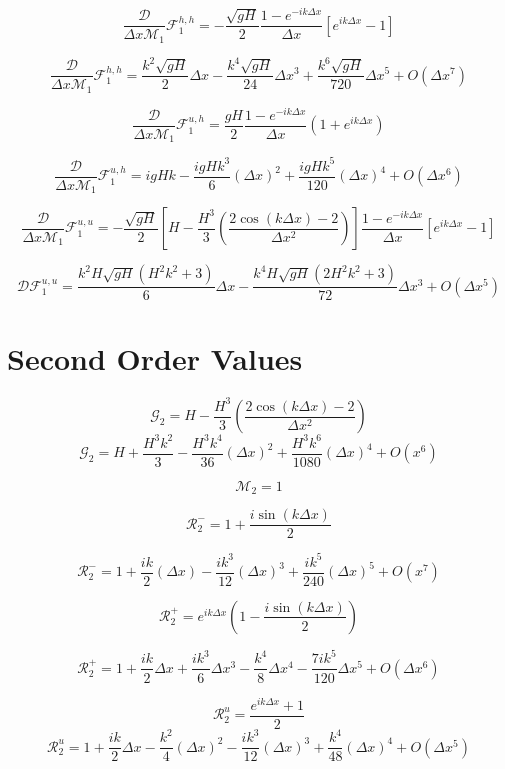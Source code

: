\documentclass[12pt]{article}
\begin{document}
\[\frac{\mathcal{D}}{\Delta x\mathcal{M}_1}\mathcal{F}^{h,h}_1 = -\dfrac{ \sqrt{gH}}{ 2} \frac{1 -e^{-ik\Delta x}}{\Delta x} \left [ e^{ik\Delta x}- 1 \right ]\]

\[\frac{\mathcal{D}}{\Delta x\mathcal{M}_1}\mathcal{F}^{h,h}_1 = \frac{k^2\sqrt{gH} }{ 2}  \Delta x - \frac{k^4\sqrt{gH}}{ 24}  \Delta x^3 + \frac{k^6\sqrt{gH}}{ 720}  \Delta x^5 + O( \Delta x^7) \]

\[\frac{\mathcal{D}}{\Delta x\mathcal{M}_1}\mathcal{F}^{u,h}_1 = \dfrac{ gH}{ 2}\frac{1 -e^{-ik\Delta x}}{\Delta x} \left(1 + e^{ik\Delta x}\right)\]


\[\frac{\mathcal{D}}{\Delta x\mathcal{M}_1}\mathcal{F}^{u,h}_1 =  igHk -\frac{igHk^3}{6} (\Delta x)^2 + \frac{igHk^5}{120} (\Delta x)^4 +  O( \Delta x^6) \]

\[\frac{\mathcal{D}}{\Delta x\mathcal{M}_1}\mathcal{F}^{u,u}_1 = - \dfrac{ \sqrt{gH}}{ 2} \left[H - \frac{H^3}{3}\left(\frac{ 2\cos\left(k\Delta x\right) - 2 }{\Delta x^2}\right) \right]\frac{1 -e^{-ik\Delta x}}{\Delta x} \left [ e^{ik\Delta x}  -  1  \right ]\]

\[\mathcal{D}\mathcal{F}^{u,u}_1 = \frac{k^2 H \sqrt{gH} (H^2k^2 + 3) }{6}\Delta x - \frac{k^4 H \sqrt{gH} (2H^2k^2 + 3) }{72}\Delta x^3  +  O( \Delta x^5)   \]


\section{Second Order Values }
\[\mathcal{G}_2 = H - \frac{H^3}{3}\left(\frac{ 2\cos\left(k\Delta x\right) - 2 }{\Delta x^2}\right)\]
\[\mathcal{G}_2 = H +\frac{H^3 k^2}{3}  -\frac{H^3 k^4}{36}(\Delta x)^2 + \frac{H^3 k^6}{1080}(\Delta x)^4 + O(x^{6})\]

\[\mathcal{M}_2 = 1\]


\[\mathcal{R}_2^- = 1  + \frac{i\sin\left(k\Delta x\right)}{2}\]

\[\mathcal{R}_2^- = 1  + \frac{ik}{2} (\Delta x) - \frac{ik^3}{12}(\Delta x)^3 + \frac{ik^5}{240}(\Delta x)^5  +  O(x^{7})\]


\[\mathcal{R}_2^+ = e^{ik\Delta x}\left(1  - \frac{i\sin\left(k\Delta x\right)}{2} \right)\]

\[\mathcal{R}_2^+ =1 + \frac{ik}{2}\Delta x + \frac{i k^3}{6} \Delta x^3 - \frac{k^4}{8} \Delta x^4  - \frac{7ik^5}{120} \Delta x^5 + O\left(\Delta x ^6\right)\]


\[\mathcal{R}^u_2 = \frac{e^{ik\Delta x } + 1}{2} \]
\[\mathcal{R}^u_2 = 1 + \frac{ik}{2}\Delta x - \frac{k^2}{4} (\Delta x)^2 - \frac{i k^3}{12} ( \Delta x)^3 + \frac{k^4}{48} ( \Delta x)^4+  O( \Delta x^5)\]
\end{document}
